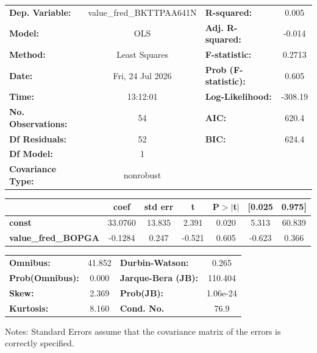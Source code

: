\begin{center}
\begin{tabular}{lclc}
\toprule
\textbf{Dep. Variable:}     & value\_fred\_BKTTPAA641N & \textbf{  R-squared:         } &     0.005   \\
\textbf{Model:}             &           OLS            & \textbf{  Adj. R-squared:    } &    -0.014   \\
\textbf{Method:}            &      Least Squares       & \textbf{  F-statistic:       } &    0.2713   \\
\textbf{Date:}              &     Fri, 24 Jul 2026     & \textbf{  Prob (F-statistic):} &    0.605    \\
\textbf{Time:}              &         13:12:01         & \textbf{  Log-Likelihood:    } &   -308.19   \\
\textbf{No. Observations:}  &              54          & \textbf{  AIC:               } &     620.4   \\
\textbf{Df Residuals:}      &              52          & \textbf{  BIC:               } &     624.4   \\
\textbf{Df Model:}          &               1          & \textbf{                     } &             \\
\textbf{Covariance Type:}   &        nonrobust         & \textbf{                     } &             \\
\bottomrule
\end{tabular}
\begin{tabular}{lcccccc}
                            & \textbf{coef} & \textbf{std err} & \textbf{t} & \textbf{P$> |$t$|$} & \textbf{[0.025} & \textbf{0.975]}  \\
\midrule
\textbf{const}              &      33.0760  &       13.835     &     2.391  &         0.020        &        5.313    &       60.839     \\
\textbf{value\_fred\_BOPGA} &      -0.1284  &        0.247     &    -0.521  &         0.605        &       -0.623    &        0.366     \\
\bottomrule
\end{tabular}
\begin{tabular}{lclc}
\textbf{Omnibus:}       & 41.852 & \textbf{  Durbin-Watson:     } &    0.265  \\
\textbf{Prob(Omnibus):} &  0.000 & \textbf{  Jarque-Bera (JB):  } &  110.404  \\
\textbf{Skew:}          &  2.369 & \textbf{  Prob(JB):          } & 1.06e-24  \\
\textbf{Kurtosis:}      &  8.160 & \textbf{  Cond. No.          } &     76.9  \\
\bottomrule
\end{tabular}
\end{center}

Notes: \newline
 [1] Standard Errors assume that the covariance matrix of the errors is correctly specified.